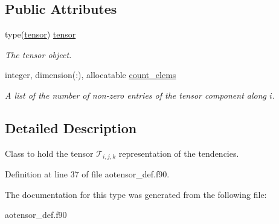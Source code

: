 \subsection*{Public Attributes}
\begin{DoxyCompactItemize}
\item 
\mbox{\label{structaotensor__def_1_1atmoctensor_aaf86d2b5e7f1795e126c1ef0ee8f2410}} 
type(\hyperlink{structtensor__def_1_1tensor}{tensor}) \hyperlink{structaotensor__def_1_1atmoctensor_aaf86d2b5e7f1795e126c1ef0ee8f2410}{tensor}
\begin{DoxyCompactList}\small\item\em The tensor object. \end{DoxyCompactList}\item 
\mbox{\label{structaotensor__def_1_1atmoctensor_a5a23605208a527fa929aeb385b5481ab}} 
integer, dimension(\+:), allocatable \hyperlink{structaotensor__def_1_1atmoctensor_a5a23605208a527fa929aeb385b5481ab}{count\+\_\+elems}
\begin{DoxyCompactList}\small\item\em A list of the number of non-\/zero entries of the tensor component along $i$. \end{DoxyCompactList}\end{DoxyCompactItemize}


\subsection{Detailed Description}
Class to hold the tensor $\mathcal{T}_{i,j,k}$ representation of the tendencies. 

Definition at line 37 of file aotensor\+\_\+def.\+f90.



The documentation for this type was generated from the following file\+:\begin{DoxyCompactItemize}
\item 
aotensor\+\_\+def.\+f90\end{DoxyCompactItemize}

